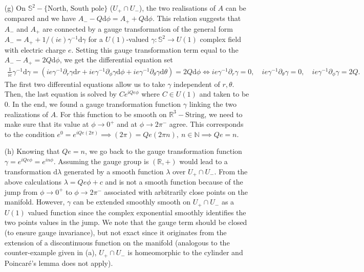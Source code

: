 \documentclass[10pt, a4paper]{article}
\begin{document}
{\begin{enumerate}
  \item[(g)] On $\mathbb{S}^2-\{\text{North, South pole}\}$ ($U_{+} \cap U_{-}$), the two realisations of $A$ can be compared and we have $A_- - Q\text{d}\phi = A_+ + Q\text{d}\phi$. This relation suggests that $A_-$ and $A_+$ are connected by a gauge transformation of the general form $A_- = A_+ + 1/(ie) \gamma^{-1} \text{d}\gamma$ for a $U(1)$-valued $\gamma : \mathbb{S}^2 \to U(1)$ complex field with electric charge $e$. Setting this gauge transformation term equal to the $A_--A_+ = 2Q\text{d}\phi$, we get the differential equation set 
  \begin{align*}
    \frac{1}{ie}\gamma^{-1} \text{d}\gamma = (ie\gamma^{-1}\partial_r \gamma \text{d}r + ie\gamma^{-1}\partial_\phi \gamma \text{d}\phi + ie\gamma^{-1}\partial_\theta \gamma \text{d}\theta)  = 2 Q \text{d}\phi \iff ie\gamma^{-1}\partial_r \gamma = 0, \quad ie\gamma^{-1}\partial_\theta \gamma = 0, \quad ie\gamma^{-1}\partial_\phi \gamma = 2Q. 
  \end{align*}
  The first two differential equations allow us to take $\gamma$ independent of $r, \theta$. Then, the last equation is solved by $C e^{i Qe\phi}$ where $C\in U(1)$ and taken to be $0$. In the end, we found a gauge transformation function $\gamma$ linking the two realizations of $A$. For this function to be smooth on $\mathbb{R}^3-\text{String}$, we need to make sure that its value at $\phi \to 0^+$ and at $\phi \to 2\pi^-$ agree. This corresponds to the condition $e^{0} = e^{i Qe(2\pi)}\implies (2\pi) = Qe (2\pi n),\ n \in \mathbb{N} \implies Qe = n$.  

  \item[(h)] Knowing that $Qe = n$, we go back to the gauge transformation function $\gamma = e^{i Qe \phi} =  e^{i n \phi}$. Assuming the gauge group is $(\mathbb{R}, +)$ would lead to a transformation $\text{d}\lambda$ generated by a smooth function $\lambda$ over $U_{+} \cap U_{-}$. From the above calculations $\lambda = Qe\phi + c$ and is not a smooth function because of the jump from $\phi \to 0^+$ to $\phi \to 2\pi^-$ associated with arbitrarily close points on the manifold. However, $\gamma$ can be extended smoothly smooth on $U_{+} \cap U_{-}$ as a $U(1)$ valued function since the complex exponential smoothly identifies the two points values in the jump. We note that the gauge term should be closed (to ensure gauge invariance), but not exact since it originates from the extension of a discontinuous function on the manifold (analogous to the counter-example given in (a), $U_{+} \cap U_{-}$ is homeomorphic to the cylinder and Poincaré's lemma does not apply). 
  

\end{enumerate}}
\end{document}
